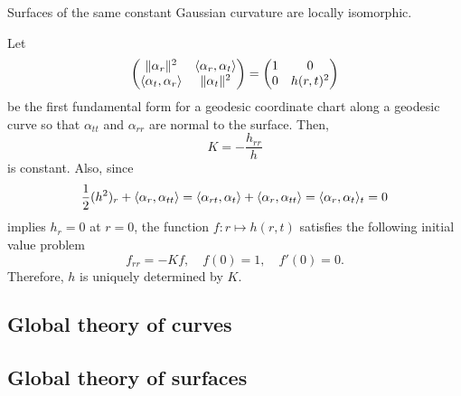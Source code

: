 \documentclass{../../large}
\renewcommand{\a}{\alpha}
\begin{document}
\begin{prb}
Surfaces of the same constant Gaussian curvature are locally isomorphic.
\end{prb}
\begin{pf}
Let
\[\mat{\|\a_r\|^2&\<\a_r,\a_t\>\\\<\a_t,\a_r\>&\|\a_t\|^2}=\mat{1&0\\0&h(r,t)^2}\]
be the first fundamental form for a geodesic coordinate chart along a geodesic curve so that $\a_{tt}$ and $\a_{rr}$ are normal to the surface.
Then,
\[K=-\frac{h_{rr}}h\]
is constant.
Also, since
\[\frac12(h^2)_r+\<\a_r,\a_{tt}\>=\<\a_{rt},\a_t\>+\<\a_r,\a_{tt}\>=\<\a_r,\a_t\>_t=0\]
implies $h_r=0$ at $r=0$, the function $f:r\mapsto h(r,t)$ satisfies the following initial value problem
\[f_{rr}=-Kf,\quad f(0)=1,\quad f'(0)=0.\]
Therefore, $h$ is uniquely determined by $K$.
\end{pf}




























\subsection*{Global theory of curves}
\begin{prb}
\end{prb}
\begin{prb}
\end{prb}
\begin{prb}[Ovals]
\end{prb}

\subsection*{Global theory of surfaces}
\begin{prb}
\end{prb}
\begin{prb}
\end{prb}
\begin{prb}
\end{prb}
\end{document}
